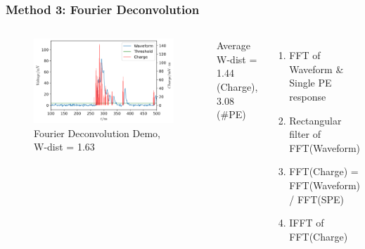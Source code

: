 \documentclass{beamer}
\begin{document}
\begin{frame}
\frametitle{Method 3: Fourier Deconvolution}
\begin{columns}
\begin{figure}
    \centering
    \caption{Fourier Deconvolution Demo, W-dist = 1.63}
    \includegraphics[width=1.0\linewidth]{img/fftrans.png}
\end{figure}
\vspace{-4mm}
\begin{center}
    Average W-dist = 1.44 (Charge), 3.08 (\#PE)
\end{center}
\begin{enumerate}
    \item FFT of Waveform \& Single PE response
    \item Rectangular filter of FFT(Waveform)
    \item FFT(Charge) = FFT(Waveform) / FFT(SPE)
    \item IFFT of FFT(Charge)
\end{enumerate}
\end{columns}
\end{frame}
\end{document}
